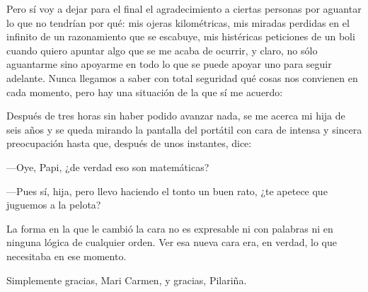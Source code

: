 \documentclass[a4paper,10pt]{article}
\begin{document}
\par\vspace{10pt}

Pero sí voy a dejar para el final el agradecimiento a ciertas personas por aguantar lo que no tendrían por qué: mis ojeras kilométricas, mis miradas perdidas en el infinito de un razonamiento que se escabuye, mis histéricas peticiones de un boli cuando quiero apuntar algo que se me acaba de ocurrir, y claro, no sólo aguantarme sino apoyarme en todo lo que se puede apoyar uno para seguir adelante. Nunca llegamos a saber con total seguridad qué cosas nos convienen en cada momento, pero hay una situación de la que sí me acuerdo:

\par\vspace{10pt}

Después de tres horas sin haber podido avanzar nada, se me acerca mi hija de seis años y se queda mirando la pantalla del portátil con cara de intensa y sincera preocupación hasta que, después de unos instantes, dice:

\par\vspace{10pt}

---Oye, Papi, ¿de verdad eso son matemáticas?

\par\vspace{10pt}

---Pues sí, hija, pero llevo haciendo el tonto un buen rato, ¿te apetece que juguemos a la pelota?

\par\vspace{10pt}

La forma en la que le cambió la cara no es expresable ni con palabras ni en ninguna lógica de cualquier orden. Ver esa nueva cara era, en verdad, lo que necesitaba en ese momento. 

\par\vspace{10pt}

Simplemente gracias, Mari Carmen, y gracias, Pilariña. 

\newpage
\thispagestyle{empty}
\ 
\newpage
\thispagestyle{empty}
\vspace{24pt}
\tableofcontents

\newpage
\thispagestyle{empty}
\ 
\newpage
\thispagestyle{empty}
\vspace{24pt}
\listoffigures

\newpage
\thispagestyle{empty}
\ 
\newpage
\vspace{24pt}
\end{document}
